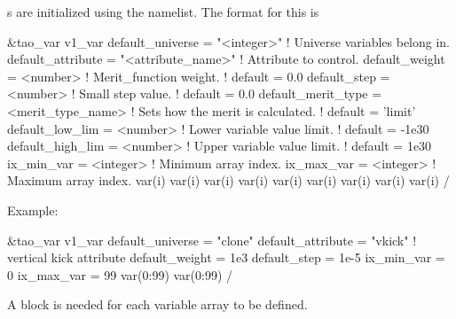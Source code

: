 {s are initialized using the  namelist. The
format for this is
\begin{example}
  \&tao_var
    v1_var%
    default_universe   = "<integer>"         ! Universe variables belong in.
    default_attribute  = "<attribute_name>"  ! Attribute to control.
    default_weight     = <number>            ! Merit_function weight.
                                             ! default = 0.0
    default_step       = <number>            ! Small step value.
                                             ! default = 0.0
    default_merit_type = <merit_type_name>   ! Sets how the merit is calculated.
                                             ! default = 'limit'
    default_low_lim    = <number>            ! Lower variable value limit. 
                                             ! default = -1e30
    default_high_lim   = <number>            ! Upper variable value limit. 
                                             ! default =  1e30
    ix_min_var         = <integer>           ! Minimum array index.
    ix_max_var         = <integer>           ! Maximum array index.
    var(i)%
    var(i)%
    var(i)%
    var(i)%
    var(i)%
    var(i)%
    var(i)%
    var(i)%
    var(i)%
  /
\end{example}
Example:
\begin{example}
  \&tao_var
    v1_var%
    default_universe  = "clone"
    default_attribute = "vkick"     ! vertical kick attribute
    default_weight    = 1e3
    default_step      = 1e-5
    ix_min_var        = 0
    ix_max_var        = 99
    var(0:99)%
    var(0:99)%
  /
\end{example}

A  block is needed for each variable array to be defined.
\vn{v1_var%
commands. The \vn{var(i)} array of variables has an index \vn{i} that runs
from \vn{ix_min_var} to \vn{ix_max_var}. Each variable has a name 
\vn{var(i)%
A lattice element name \vn{var(i)%
\vn{var(i)%
\vn{exist} and the element names of non--existant elements should be undefined
or set to a name with only spaces in it. For those variables where
\vn{var(i)%
will be used. 


}}}}}}
